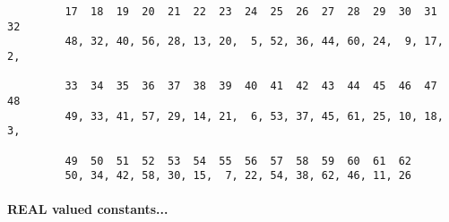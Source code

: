 \begin{itemize}
\begin{minipage}[t]{\textwidth}
\begin{verbatim}
         17  18  19  20  21  22  23  24  25  26  27  28  29  30  31  32
         48, 32, 40, 56, 28, 13, 20,  5, 52, 36, 44, 60, 24,  9, 17,  2,

         33  34  35  36  37  38  39  40  41  42  43  44  45  46  47  48
         49, 33, 41, 57, 29, 14, 21,  6, 53, 37, 45, 61, 25, 10, 18,  3, 

         49  50  51  52  53  54  55  56  57  58  59  60  61  62
         50, 34, 42, 58, 30, 15,  7, 22, 54, 38, 62, 46, 11, 26
\end{verbatim}
\normalsize
\end{minipage}
\end{itemize}

\paragraph{REAL valued constants...}
